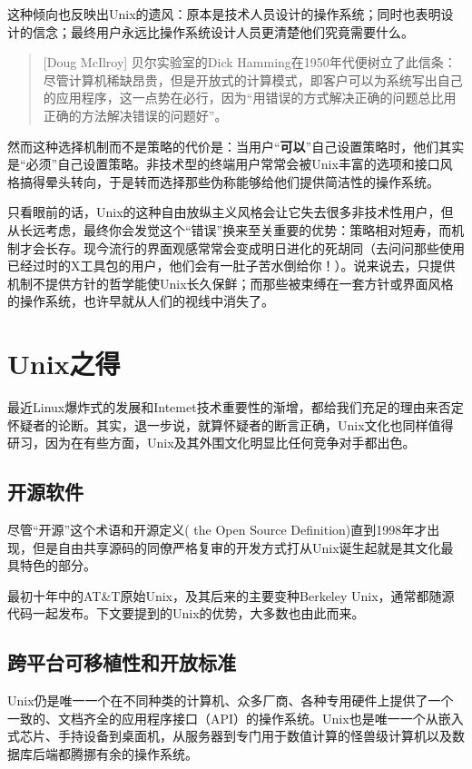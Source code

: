 \documentclass[12pt,oneside]{book}
\begin{document}
\begin{common-format}
这种倾向也反映出Unix的遗风：原本是技术人员设计的操作系统；同时也表明设计的信念；最终用户永远比操作系统设计人员更清楚他们究竟需要什么。

\begin{quote}[Doug McIlroy]
贝尔实验室的Dick Hamming在1950年代便树立了此信条：尽管计算机稀缺昂贵，但是开放式的计算模式，即客户可以为系统写出自己的应用程序，这一点势在必行，因为“用错误的方式解决正确的问题总比用正确的方法解决错误的问题好”。
\end{quote}

然而这种选择机制而不是策略的代价是：当用户“\textbf{可以}”自己设置策略时，他们其实是“必须”自己设置策略。非技术型的终端用户常常会被Unix丰富的选项和接口风格搞得晕头转向，于是转而选择那些伪称能够给他们提供简洁性的操作系统。

只看眼前的话，Unix的这种自由放纵主义风格会让它失去很多非技术性用户，但从长远考虑，最终你会发觉这个“错误”换来至关重要的优势：策略相对短寿，而机制才会长存。现今流行的界面观感常常会变成明日进化的死胡同（去问问那些使用已经过时的X工具包的用户，他们会有一肚子苦水倒给你！）。说来说去，只提供机制不提供方针的哲学能使Unix长久保鲜；而那些被束缚在一套方针或界面风格的操作系统，也许早就从人们的视线中消失了。


\section{Unix之得}
最近Linux爆炸式的发展和Intemet技术重要性的渐增，都给我们充足的理由来否定怀疑者的论断。其实，退一步说，就算怀疑者的断言正确，Unix文化也同样值得研习，因为在有些方面，Unix及其外围文化明显比任何竞争对手都出色。

\subsection{开源软件}
尽管“开源”这个术语和开源定义( the Open Source Definition)直到1998年才出现，但是自由共享源码的同僚严格复审的开发方式打从Unix诞生起就是其文化最具特色的部分。

最初十年中的AT\&{}T原始Unix，及其后来的主要变种Berkeley Unix，通常都随源代码一起发布。下文要提到的Unix的优势，大多数也由此而来。

\subsection{跨平台可移植性和开放标准}
Unix仍是唯一一个在不同种类的计算机、众多厂商、各种专用硬件上提供了一个一致的、文档齐全的应用程序接口（API）的操作系统。Unix也是唯一一个从嵌入式芯片、手持设备到桌面机，从服务器到专门用于数值计算的怪兽级计算机以及数据库后端都腾挪有余的操作系统。


\end{common-format}
\end{document}
